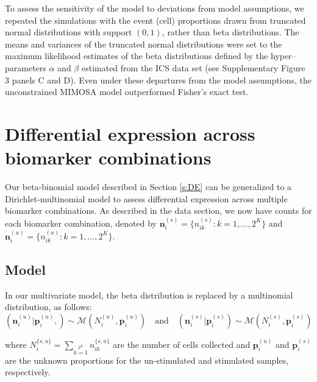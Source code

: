 \documentclass[12pt,oupdraft]{biostatistics}
\begin{document}
To assess the sensitivity of the model to deviations from model assumptions, we repeated the simulations with the event (cell) proportions drawn from  truncated normal distributions with support $(0,1)$, rather than beta distributions. The means and variances of the truncated normal distributions were set to the maximum likelihood estimates of the beta distributions defined by the hyper--parameters  $\alpha$ and $\beta$ estimated from the ICS data set (see Supplementary Figure 3 panels C and D). Even under these departures from the model assumptions, the unconstrained MIMOSA model outperformed Fisher's exact test.

\section{Differential expression across biomarker combinations}
\label{s:demarkercombos}
Our beta-binomial model described in Section \ref{s:DE} can be generalized to a Dirichlet-multinomial model to assess differential expression across multiple biomarker combinations. As described in the data section, we now have counts for each biomarker combination, denoted by  $\mathbf{n}^{(s)}_{i}=\{n^{(s)}_{ik}: k=1,\dots,2^K\}$ and $\mathbf{n}^{(u)}_{i}=\{n^{(u)}_{ik}: k=1,\dots,2^K\}$.

\subsection{Model}

In our multivariate model, the beta distribution is replaced by a multinomial distribution, as follows:
\begin{equation*}
 (\mathbf{n}^{(u)}_{i}|\mathbf{p}^{(u)}_{i},) \sim \mathcal{M}(N^{(u)}_{i},\mathbf{p}^{(u)}_{i})\quad\text{and}\quad (\mathbf{n}^{(s)}_{i}|\mathbf{p}^{(s)}_{i}) \sim \mathcal{M}(N^{(s)}_{i},\mathbf{p}^{(s)}_{i})\label{eq:mult_likeliehood}
 \end{equation*}

where $N^{\{s,u\}}_{i}=\sum\limits_{k=1}\limits^{2^K} n^{\{s,u\}}_{ik}$ are the number of cells collected and $\mathbf{p}^{(u)}_{i}$ and $\mathbf{p}^{(s)}_{i}$ are the unknown proportions for the un-stimulated and stimulated samples, respectively.
\end{document}
